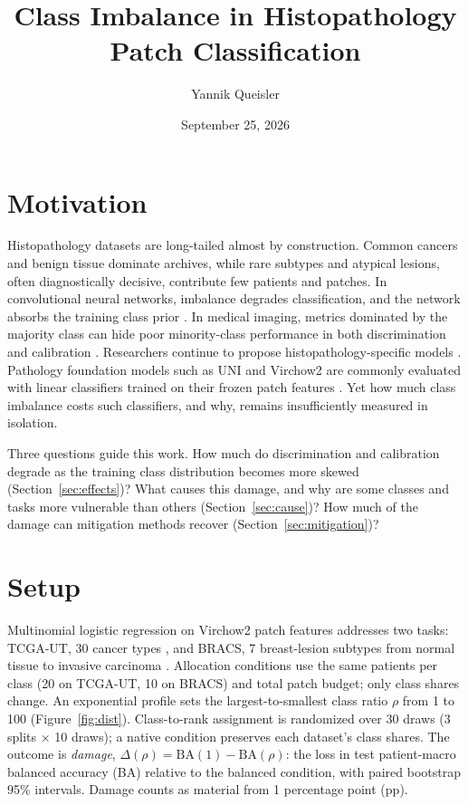 \documentclass[11pt]{article}
\title{\vspace{-1cm}\LARGE Class Imbalance in Histopathology Patch Classification\vspace{-0.5em}}
\author{Yannik Queisler}
\date{September 25, 2026}
\begin{document}
\maketitle

\section{Motivation}
Histopathology datasets are long-tailed almost by construction. Common cancers and benign tissue dominate archives, while rare subtypes and atypical lesions, often diagnostically decisive, contribute few patients and patches. In convolutional neural networks, imbalance degrades classification, and the network absorbs the training class prior \citep{buda2018classImbalance}. In medical imaging, metrics dominated by the majority class can hide poor minority-class performance in both discrimination and calibration \citep{mosquera2024classImbalance}. Researchers continue to propose histopathology-specific models \citep{cong2022imbalancedHistopathology}. Pathology foundation models such as UNI and Virchow2 are commonly evaluated with linear classifiers trained on their frozen patch features \citep{chen2024uni,zimmermann2024virchow2}. Yet how much class imbalance costs such classifiers, and why, remains insufficiently measured in isolation.

Three questions guide this work. How much do discrimination and calibration degrade as the training class distribution becomes more skewed (Section~\ref{sec:effects})? What causes this damage, and why are some classes and tasks more vulnerable than others (Section~\ref{sec:cause})? How much of the damage can mitigation methods recover (Section~\ref{sec:mitigation})?

\section{Setup}
Multinomial logistic regression on Virchow2 patch features \citep{zimmermann2024virchow2} addresses two tasks: TCGA-UT, 30 cancer types \citep{komura2022universalEncoding}, and BRACS, 7 breast-lesion subtypes from normal tissue to invasive carcinoma \citep{brancati2022bracs}. Allocation conditions use the same patients per class (20 on TCGA-UT, 10 on BRACS) and total patch budget; only class shares change. An exponential profile sets the largest-to-smallest class ratio $\rho$ from 1 to 100 (Figure~\ref{fig:dist}). Class-to-rank assignment is randomized over 30 draws (3 splits $\times$ 10 draws); a native condition preserves each dataset's class shares. The outcome is \emph{damage}, $\Delta(\rho)=\mathrm{BA}(1)-\mathrm{BA}(\rho)$: the loss in test patient-macro balanced accuracy (BA) relative to the balanced condition, with paired bootstrap 95\% intervals. Damage counts as material from 1 percentage point (pp).
\end{document}
